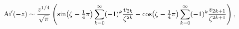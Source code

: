 \[\mathop{\mathrm{Ai}\/}\nolimits'\!\left(-z\right)\sim\frac{z^{1/4}}{\sqrt{\pi}%
}\left(\mathop{\sin\/}\nolimits\!\left(\zeta-\tfrac{1}{4}\pi\right)\sum_{k=0}^%
{\infty}(-1)^{k}\frac{v_{2k}}{\zeta^{2k}}-\mathop{\cos\/}\nolimits\!\left(%
\zeta-\tfrac{1}{4}\pi\right)\sum_{k=0}^{\infty}(-1)^{k}\frac{v_{2k+1}}{\zeta^{%
2k+1}}\right),\]